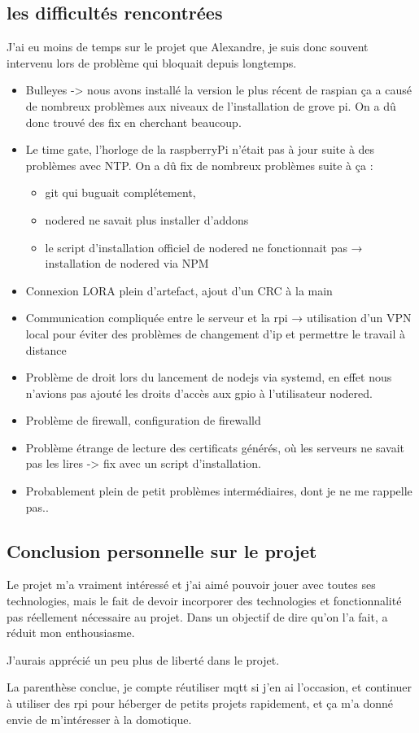 \subsection{les difficultés rencontrées}
J'ai eu moins de temps sur le projet que Alexandre, je suis donc souvent intervenu lors de problème qui bloquait depuis longtemps.
\begin{itemize}
    \item Bulleyes -> nous avons installé la version le plus récent de raspian ça a causé de nombreux problèmes aux niveaux de l'installation de grove pi. On a dû donc trouvé des fix en cherchant beaucoup.
    \item Le time gate, l'horloge de la raspberryPi n'était pas à jour suite à des problèmes avec NTP.
    On a dû fix de nombreux problèmes suite à ça :
    \begin{itemize}
        \item git qui buguait complétement,
        \item nodered ne savait plus installer d'addons
        \item le script d'installation officiel de nodered ne fonctionnait pas → installation de nodered via NPM
    \end{itemize}
    \item Connexion LORA plein d'artefact, ajout d'un CRC à la main
    \item Communication compliquée entre le serveur et la rpi → utilisation d'un VPN local pour éviter des problèmes de changement d'ip et permettre le travail à distance
    \item Problème de droit lors du lancement de nodejs via systemd, en effet nous n'avions pas ajouté les droits d'accès aux gpio à l'utilisateur nodered.
    \item Problème de firewall, configuration de firewalld
    \item Problème étrange de lecture des certificats générés, où les serveurs ne savait pas les lires -> fix avec un script d'installation.
    \item Probablement plein de petit problèmes intermédiaires, dont je ne me rappelle pas..
\end{itemize}
\subsection{Conclusion personnelle sur le projet}
Le projet m'a vraiment intéressé et j'ai aimé pouvoir jouer avec toutes ses technologies, mais le fait de devoir incorporer des technologies et fonctionnalité pas réellement nécessaire au projet. Dans un objectif de dire qu'on l'a fait, a réduit mon enthousiasme. 

J'aurais apprécié un peu plus de liberté dans le projet.

La parenthèse conclue, je compte réutiliser mqtt si j'en ai l'occasion, et continuer à utiliser des rpi pour héberger de petits projets rapidement, et ça m'a donné envie de m'intéresser à la domotique.
